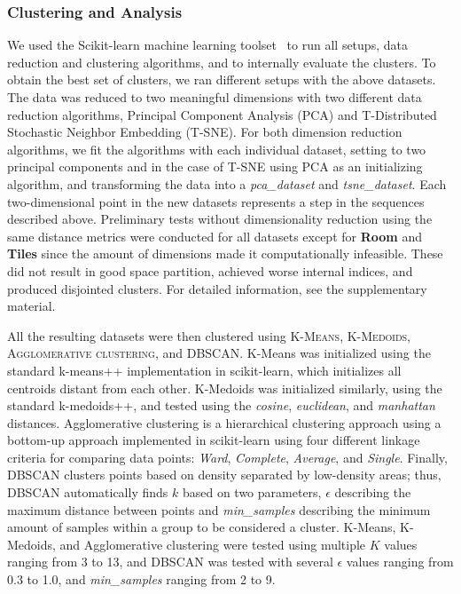 \subsubsection{Clustering and Analysis}


We used the Scikit-learn machine learning toolset~ to run all setups, data reduction and clustering algorithms, and to internally evaluate the clusters. To obtain the best set of clusters, we ran different setups with the above datasets. The data was reduced to two meaningful dimensions with two different data reduction algorithms, Principal Component Analysis (PCA) and T-Distributed Stochastic Neighbor Embedding (T-SNE). For both dimension reduction algorithms, we fit the algorithms with each individual dataset, setting to two principal components and in the case of T-SNE using PCA as an initializing algorithm, and transforming the data into a \emph{pca\_dataset} and \emph{tsne\_dataset}. Each two-dimensional point in the new datasets represents a step in the sequences described above. Preliminary tests without dimensionality reduction using the same distance metrics were conducted for all datasets except for \textbf{Room} and \textbf{Tiles} since the amount of dimensions made it computationally infeasible. These did not result in good space partition, achieved worse internal indices, and produced disjointed clusters. For detailed information, see the supplementary material.  %

All the resulting datasets were then clustered using \textsc{K-Means, K-Medoids, Agglomerative clustering}, and \textsc{DBSCAN}. K-Means was initialized using the standard k-means++ implementation in scikit-learn, which initializes all centroids distant from each other. K-Medoids was initialized similarly, using the standard k-medoids++, and tested using the \emph{cosine}, \emph{euclidean}, and \emph{manhattan} distances. Agglomerative clustering is a hierarchical clustering approach using a bottom-up approach implemented in scikit-learn using four different linkage criteria for comparing data points: \emph{Ward}, \emph{Complete}, \emph{Average}, and \emph{Single}. Finally, DBSCAN clusters points based on density separated by low-density areas; thus, DBSCAN automatically finds $k$ based on two parameters, $\epsilon$ describing the maximum distance between points and \emph{min\_samples} describing the minimum amount of samples within a group to be considered a cluster. K-Means, K-Medoids, and Agglomerative clustering were tested using multiple $K$ values ranging from 3 to 13, and DBSCAN was tested with several $\epsilon$ values ranging from 0.3 to 1.0, and \emph{min\_samples} ranging from 2 to 9.

